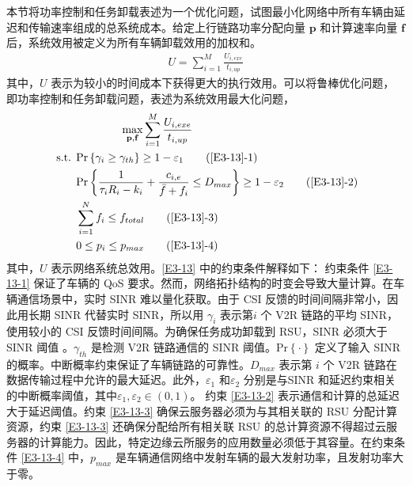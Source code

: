 本节将功率控制和任务卸载表述为一个优化问题，试图最小化网络中所有车辆由延迟和传输速率组成的总系统成本。给定上行链路功率分配向量 $\mathbf{p}$ 和计算速率向量 $\mathbf{f}$ 后，系统效用被定义为所有车辆卸载效用的加权和。
\begin{eqnarray}\label{E12}
U=\sum_{i=1}^{M}\frac{U_{i,exe}}{t_{i,up}}
\end{eqnarray}
其中，$U$ 表示为较小的时间成本下获得更大的执行效用。可以将鲁棒优化问题，即功率控制和任务卸载问题，表述为系统效用最大化问题，
\begin{align}
 &\qquad\qquad\max\limits_{\mathbf{p},\mathbf{f}}\sum_{i=1}^{M}\frac{U_{i,exe}}{t_{i,up}}                                   \label{E3-13}\\
\text { s.t. }
& \textrm{Pr}\left\{\gamma_i\geq\gamma_{th}\right\}\geq1-\varepsilon_1                                         \tag{\ref{E3-13}{-1}}      \label{E3-13-1}\\  %
& \textrm{Pr}\left\{\frac{1}{\tau_iR_i-k_i}+\frac{c_{i,e}}{\bar{f}+f_i}\le D_{max}\right\}\geq1-\varepsilon_2  \tag{\ref{E3-13}{-2}}      \label{E3-13-2}\\  %
& \sum_{i=1}^{N}f_i\le f_{total}                                                                                \tag{\ref{E3-13}{-3}}      \label{E3-13-3}\\  %
& 0 \le p_i\le p_{max}                                                                                          \tag{\ref{E3-13}{-4}}      \label{E3-13-4} %
\end{align}
其中，$U$ 表示网络系统总效用。\eqref{E3-13} 中的约束条件解释如下： 约束条件 \eqref{E3-13-1} 保证了车辆的 QoS 要求。然而，网络拓扑结构的时变会导致大量计算。在车辆通信场景中，实时 SINR 难以量化获取。由于 CSI 反馈的时间间隔非常小，因此用长期 SINR 代替实时 SINR，所以用 $\gamma_i$ 表示第$i$ 个 V2R {链路的平均 SINR，使用较小的 CSI 反馈时间间隔}。为确保任务成功卸载到 RSU，SINR 必须大于 SINR 阈值 \cite{liu2021}。$\gamma_{th}$ 是检测 V2R 链路通信的 SINR 阈值。$\textrm{Pr}\left\{\cdot\right\}$ 定义了输入 SINR 的概率。中断概率约束保证了车辆链路的可靠性。$D_{max}$ 表示第 $i$ 个 V2R 链路在数据传输过程中允许的最大延迟。此外，$\varepsilon_1$ 和$\varepsilon_2$ 分别是与SINR 和延迟约束相关的中断概率阈值，其中$\varepsilon_1,\varepsilon_2\in\left(0,1\right)$。 约束 \eqref{E3-13-2} 表示通信和计算的总延迟大于延迟阈值。约束 \eqref{E3-13-3} 确保云服务器必须为与其相关联的 RSU 分配计算资源，约束 \eqref{E3-13-3} 还确保分配给所有相关联 RSU 的总计算资源不得超过云服务器的计算能力。因此，特定边缘云所服务的应用数量必须低于其容量。在约束条件 \eqref{E3-13-4} 中，$p_{max}$ 是车辆通信网络中发射车辆的最大发射功率，且发射功率大于零。

